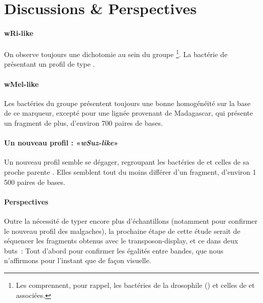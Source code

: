 
\section{Discussions \& Perspectives} %
\label{sec:discussions}

\paragraph{wRi-like} %
\label{par:wri_like}
On observe toujours une dichotomie au sein du groupe \footnote{Les  comprennent, pour rappel, les bactéries de la drosophile  () et celles de  et associées.}. La bactérie de  présentant un profil de type .

\paragraph{wMel-like} %
\label{par:wmel_like}
Les bactéries du groupe  présentent toujours une bonne homogénéité sur la base de ce marqueur, excepté pour une lignée provenant de Madagascar, qui présente un fragment de plus, d'environ 700 paires de bases.

\paragraph{Un nouveau profil : «\textit{wSuz-like}»} %
\label{par:suzukii}
Un nouveau profil semble se dégager, regroupant les bactéries de  et celles de sa proche parente . Elles semblent tout du moins différer d'un fragment, d'environ 1\,500 paires de bases.

\paragraph{Perspectives\\} %
\label{par:perspectives}
Outre la nécessité de typer encore plus d'échantillons (notamment pour confirmer le nouveau profil des  malgaches),
la prochaine étape de cette étude serait de séquencer les fragments obtenus avec le transposon-display, et ce dans deux buts~:
Tout d'abord pour confirmer les égalités entre bandes, que nous n'affirmons pour l'instant que de façon visuelle.

